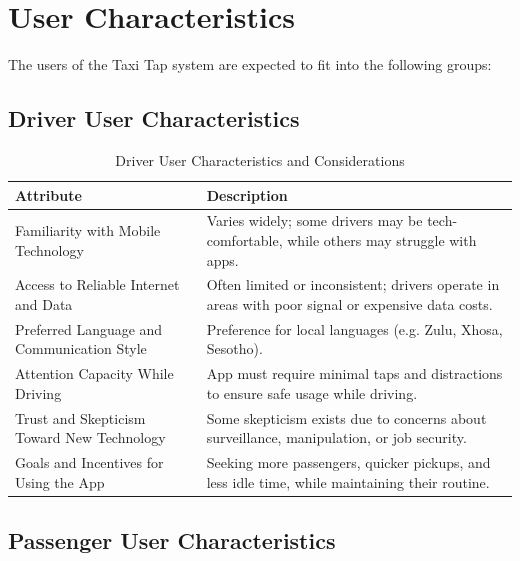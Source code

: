 \documentclass[a4paper,12pt]{article}
\begin{document}
\section{User Characteristics}

The users of the Taxi Tap system are expected to fit into the following groups:

\subsection{Driver User Characteristics}

\begin{table}[H]
\centering
\begin{tabular}{|p{5cm}|p{10cm}|}
\hline
\textbf{Attribute} & \textbf{Description} \\
\hline
Familiarity with Mobile Technology & Varies widely; some drivers may be tech-comfortable, while others may struggle with apps. \\
\hline
Access to Reliable Internet and Data & Often limited or inconsistent; drivers operate in areas with poor signal or expensive data costs. \\
\hline
Preferred Language and Communication Style & Preference for local languages (e.g. Zulu, Xhosa, Sesotho). \\
\hline
Attention Capacity While Driving & App must require minimal taps and distractions to ensure safe usage while driving. \\
\hline
Trust and Skepticism Toward New Technology & Some skepticism exists due to concerns about surveillance, manipulation, or job security. \\
\hline
Goals and Incentives for Using the App & Seeking more passengers, quicker pickups, and less idle time, while maintaining their routine. \\
\hline
\end{tabular}
\caption{Driver User Characteristics and Considerations}
\label{tab:driver-characteristics}
\end{table}

\subsection{Passenger User Characteristics}
\end{document}
